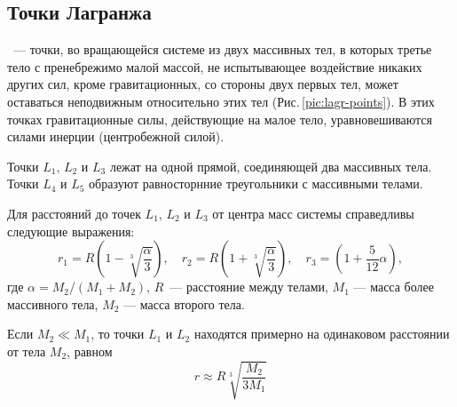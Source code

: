 \subsection{Точки Лагранжа}

~--- точки, во вращающейся системе из двух
массивных тел, в которых третье тело с пренебрежимо 
малой массой, не испытывающее воздействие никаких 
других сил, кроме гравитационных, со стороны двух 
первых тел, может оставаться неподвижным относительно 
этих тел (Рис.\,\ref{pic:lagr-points}). В этих точках гравитационные силы, 
действующие на малое тело, уравновешиваются силами инерции (центробежной силой).

Точки $L_1$, $L_2$ и $L_3$ лежат на одной прямой, 
соединяющей два массивных тела. Точки $L_4$ и $L_5$ 
образуют равносторнние треугольники с массивными 
телами.

Для расстояний до точек $L_1$, $L_2$ и $L_3$ от 
центра масс системы справедливы следующие выражения:
\begin{equation}r_1=R\left(1-\sqrt[3]{\frac{\alpha}
{3}}\right), \quad r_2=R\left(1+\sqrt[3]{\frac{\alpha}
{3}}\right), \quad r_3=\left(1+\frac{5}{12}\alpha\right),
\end{equation}
где $\alpha=M_2 / (M_1 + M_2)$, $R$~--- расстояние между 
телами, $M_1$ --- масса более массивного тела, $M_2$
 --- масса второго тела.

Если $M_2 \ll M_1$, то точки $L_1$ и $L_2$ находятся 
примерно на одинаковом расстоянии от тела $M_2$, равном
\begin{equation}
r\approx R\sqrt[3]{\frac{M_2}{3M_1}}
\end{equation}
